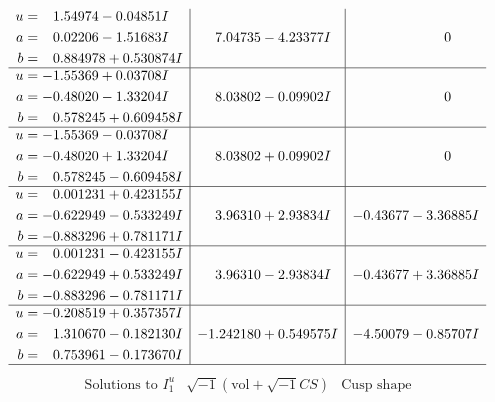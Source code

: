 \documentclass[1p]{elsarticle_modified}
\theoremstyle{definition}
\newcommand{\I}{\sqrt{-1}}
\begin{document}
$$\begin{array}{c|c|c}
\begin{aligned}
u &= \phantom{-}1.54974 - 0.04851 I \\
a &= \phantom{-}0.02206 - 1.51683 I \\
b &= \phantom{-}0.884978 + 0.530874 I\end{aligned}
 & \phantom{-}7.04735 - 4.23377 I & \phantom{-0.000000 } 0 \\ \hline\begin{aligned}
u &= -1.55369 + 0.03708 I \\
a &= -0.48020 - 1.33204 I \\
b &= \phantom{-}0.578245 + 0.609458 I\end{aligned}
 & \phantom{-}8.03802 - 0.09902 I & \phantom{-0.000000 } 0 \\ \hline\begin{aligned}
u &= -1.55369 - 0.03708 I \\
a &= -0.48020 + 1.33204 I \\
b &= \phantom{-}0.578245 - 0.609458 I\end{aligned}
 & \phantom{-}8.03802 + 0.09902 I & \phantom{-0.000000 } 0 \\ \hline\begin{aligned}
u &= \phantom{-}0.001231 + 0.423155 I \\
a &= -0.622949 - 0.533249 I \\
b &= -0.883296 + 0.781171 I\end{aligned}
 & \phantom{-}3.96310 + 2.93834 I & -0.43677 - 3.36885 I \\ \hline\begin{aligned}
u &= \phantom{-}0.001231 - 0.423155 I \\
a &= -0.622949 + 0.533249 I \\
b &= -0.883296 - 0.781171 I\end{aligned}
 & \phantom{-}3.96310 - 2.93834 I & -0.43677 + 3.36885 I \\ \hline\begin{aligned}
u &= -0.208519 + 0.357357 I \\
a &= \phantom{-}1.310670 - 0.182130 I \\
b &= \phantom{-}0.753961 - 0.173670 I\end{aligned}
 & -1.242180 + 0.549575 I & -4.50079 - 0.85707 I\\
 \hline 
 \end{array}$$\newpage$$\begin{array}{c|c|c}  
\text{Solutions to }I^u_{1}& \I (\text{vol} + \sqrt{-1}CS) & \text{Cusp shape}\\
 \hline 
\begin{aligned}

\end{aligned}
\end{array}$$
\end{document}
